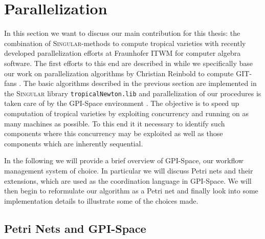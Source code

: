 \documentclass[
  paper=a4,
  titlepage,
  bibliography=totoc,
  pagesize=pdftex
]{scrartcl}
\numberwithin{figure}{section}
\numberwithin{equation}{section}
\numberwithin{table}{section}
\theoremstyle{definition}
\numberwithin{definition}{section}
\begin{document}
\section{Parallelization}

In this section we want to discuss our main contribution for this thesis: the combination
of \textsc{Singular}-methods to compute tropical varieties with recently developed
parallelization efforts at Fraunhofer ITWM for computer algebra software. The first
efforts to this end are described in \cite{towardsParallel} while we specifically base our
work on parallelization algorithms by Christian Reinbold to compute GIT-fans
\cite{reinboldGitFan}. The basic algorithms described in the previous section are
implemented in the \textsc{Singular} library \texttt{tropicalNewton.lib}
\cite{tropNewtLib} and parallelization of our procedures is taken care of by the GPI-Space
environment \cite{gpispace}. The objective is to speed up computation of tropical
varieties by exploiting concurrency and running on as many machines as possible. To this
end it it necessary to identify such components where this concurrency may be exploited as
well as those components which are inherently sequential.

In the following we will provide a brief overview of GPI-Space, our workflow management
system of choice. In particular we will discuss Petri nets and their extensions, which are
used as the coordination language in GPI-Space. We will then begin to reformulate our
algorithm as a Petri net and finally look into some implementation details to illustrate
some of the choices made.

\subsection{Petri Nets and GPI-Space}
\end{document}
